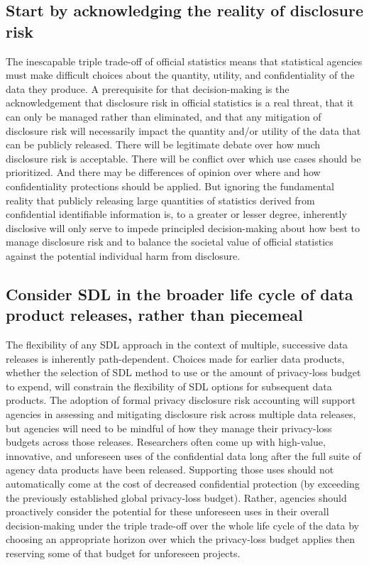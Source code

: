 \subsection{Start by acknowledging the reality of disclosure risk}
The inescapable triple trade-off of official statistics means that statistical agencies must make difficult choices about the quantity, utility, and confidentiality of the data they produce. A prerequisite for that decision-making is the acknowledgement that disclosure risk in official statistics is a real threat, that it can only be managed rather than eliminated, and that any mitigation of disclosure risk will necessarily impact the quantity and/or utility of the data that can be publicly released. There will be legitimate debate over how much disclosure risk is acceptable. There will be conflict over which use cases should be prioritized. And there may be differences of opinion over where and how confidentiality protections should be applied. But ignoring the fundamental reality that publicly releasing large quantities of statistics derived from confidential identifiable information is, to a greater or lesser degree, inherently disclosive will only serve to impede principled decision-making about how best to manage disclosure risk and to balance the societal value of official statistics against the potential individual harm from disclosure.  

\subsection{Consider SDL in the broader life cycle of data product releases, rather than piecemeal}
The flexibility of any SDL approach in the context of multiple, successive data releases is inherently path-dependent. Choices made for earlier data products, whether the selection of SDL method to use or the amount of privacy-loss budget to expend, will constrain the flexibility of SDL options for subsequent data products. The adoption of formal privacy disclosure risk accounting will support agencies in assessing and mitigating disclosure risk across multiple data releases, but agencies will need to be mindful of how they manage their privacy-loss budgets across those releases. Researchers often come up with high-value, innovative, and unforeseen uses of the confidential data long after the full suite of agency data products have been released. Supporting those uses should not automatically come at the cost of decreased confidential protection (by exceeding the previously established global privacy-loss budget). Rather, agencies should proactively consider the potential for these unforeseen uses in their overall decision-making under the triple trade-off over the whole life cycle of the data by choosing an appropriate horizon over which the privacy-loss budget applies then reserving some of that budget for unforeseen projects.

